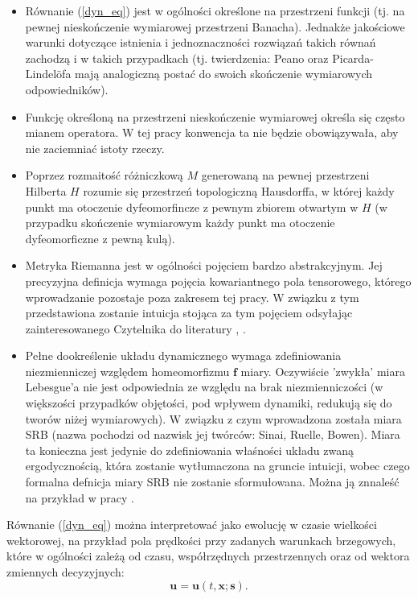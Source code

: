 \documentclass[12pt]{article}
\begin{document}
\begin{itemize}
	\item Równanie (\ref{dyn_eq}) jest w ogólności określone na przestrzeni funkcji (tj. na pewnej nieskończenie wymiarowej przestrzeni Banacha). Jednakże jakościowe warunki dotyczące istnienia i jednoznaczności rozwiązań takich równań zachodzą i w takich przypadkach (tj. twierdzenia: Peano oraz Picarda-Lindelöfa mają analogiczną postać do swoich skończenie wymiarowych odpowiedników).
	\item Funkcję określoną na przestrzeni nieskończenie wymiarowej określa się często mianem operatora. W tej pracy konwencja ta nie będzie obowiązywała, aby nie zaciemniać istoty rzeczy.
	\item Poprzez rozmaitość różniczkową $ M $ generowaną na pewnej przestrzeni Hilberta $ H $ rozumie się przestrzeń topologiczną Hausdorffa, w której każdy punkt ma otoczenie dyfeomorfincze z pewnym zbiorem otwartym w $ H$ (w przypadku skończenie wymiarowym każdy punkt ma otoczenie dyfeomorficzne z pewną kulą).
	\item Metryka Riemanna jest w ogólności pojęciem bardzo abstrakcyjnym. Jej precyzyjna definicja wymaga pojęcia kowariantnego pola tensorowego, którego wprowadzanie pozostaje poza zakresem tej pracy. W związku z tym przedstawiona zostanie intuicja stojąca za tym pojęciem odsyłając zainteresowanego Czytelnika do literatury \cite{Blackmore}, \cite{Maurin2}.
	\item Pełne dookreślenie układu dynamicznego wymaga zdefiniowania niezmienniczej względem homeomorfizmu $ \textbf{f} $ miary. Oczywiście 'zwykła' miara Lebesgue'a nie jest odpowiednia ze względu na brak niezmienniczości (w większości przypadków objętości, pod wpływem dynamiki, redukują się do tworów niżej wymiarowych). W związku z czym wprowadzona została miara SRB (nazwa pochodzi od nazwisk jej twórców: Sinai, Ruelle, Bowen). Miara ta konieczna jest jedynie do zdefiniowania właśności układu zwaną ergodycznością, która zostanie wytłumaczona na gruncie intuicji, wobec czego formalna defnicja miary SRB nie zostanie sformułowana. Można ją znnaleść na przykład w pracy \cite{Ruelle1}.
\end{itemize}
Równanie (\ref{dyn_eq}) można interpretować jako ewolucję w czasie wielkości wektorowej, na przykład pola prędkości przy zadanych warunkach brzegowych, które w ogólności zależą od czasu, współrzędnych przestrzennych oraz od wektora zmiennych decyzyjnych:
\begin{equation}
\textbf{u} = \textbf{u}(t,
\textbf{x};\textbf{s}).
\label{utxs}
\end{equation}
\end{document}

